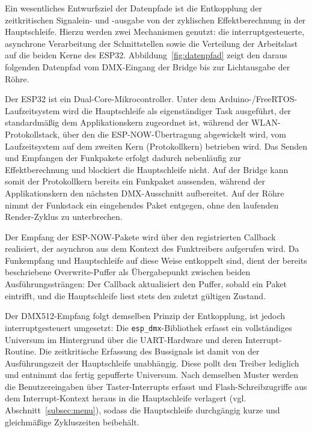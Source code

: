 Ein wesentliches Entwurfsziel der Datenpfade ist die Entkopplung der
zeitkritischen Signalein- und -ausgabe von der zyklischen
Effektberechnung in der Hauptschleife. Hierzu werden zwei Mechanismen
genutzt: die interruptgesteuerte, asynchrone Verarbeitung der
Schnittstellen sowie die Verteilung der Arbeitslast auf die beiden Kerne
des ESP32. Abbildung~\ref{fig:datenpfad} zeigt den daraus folgenden
Datenpfad vom DMX-Eingang der Bridge bis zur Lichtausgabe der Röhre.

Der ESP32 ist ein Dual-Core-Mikrocontroller. Unter dem
Arduino-/FreeRTOS-Laufzeitsystem wird die Hauptschleife als
eigenständiger Task ausgeführt, der standardmäßig dem Applikationskern
zugeordnet ist, während der WLAN-Protokollstack, über den die
ESP-NOW-Übertragung abgewickelt wird, vom Laufzeitsystem auf dem
zweiten Kern (Protokollkern) betrieben wird. Das Senden und Empfangen
der Funkpakete erfolgt dadurch nebenläufig zur Effektberechnung und
blockiert die Hauptschleife nicht. Auf der Bridge kann somit der
Protokollkern bereits ein Funkpaket aussenden, während der
Applikationskern den nächsten DMX-Ausschnitt aufbereitet. Auf der Röhre
nimmt der Funkstack ein eingehendes Paket entgegen, ohne den laufenden
Render-Zyklus zu unterbrechen.

Der Empfang der ESP-NOW-Pakete wird über den registrierten Callback
realisiert, der asynchron aus dem Kontext des Funktreibers aufgerufen
wird. Da Funkempfang und Hauptschleife auf diese
Weise entkoppelt sind, dient der bereits beschriebene Overwrite-Puffer
als Übergabepunkt zwischen beiden Ausführungssträngen: Der Callback
aktualisiert den Puffer, sobald ein Paket eintrifft, und die
Hauptschleife liest stets den zuletzt gültigen Zustand.

Der DMX512-Empfang folgt demselben Prinzip der Entkopplung, ist jedoch
interruptgesteuert umgesetzt: Die \texttt{esp\_dmx}-Bibliothek erfasst
ein vollständiges Universum im Hintergrund über die UART-Hardware und
deren Interrupt-Routine. Die zeitkritische Erfassung des Bussignals ist
damit von der Ausführungszeit der Hauptschleife unabhängig. Diese pollt
den Treiber lediglich und entnimmt das fertig gepufferte Universum. Nach
demselben Muster werden die Benutzereingaben über Taster-Interrupts
erfasst und Flash-Schreibzugriffe aus dem Interrupt-Kontext heraus in die
Hauptschleife verlagert (vgl. Abschnitt~\ref{subsec:menu}), sodass die
Hauptschleife durchgängig kurze und gleichmäßige Zykluszeiten beibehält.

